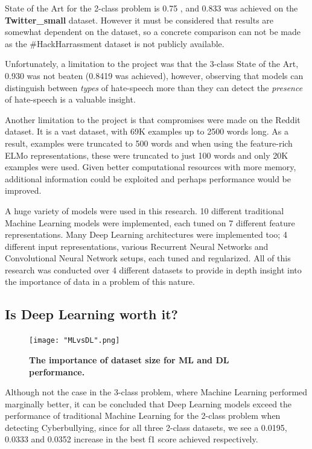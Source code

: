 \documentclass[12pt,a4paper]{article}
\begin{document}
State of the Art for the 2-class problem is 0.75 \cite{Hack}, and 0.833 was achieved on the \textbf{Twitter\_small} dataset. However it must be considered that results are somewhat dependent on the dataset, so a concrete comparison can not be made as the \#HackHarrassment dataset is not publicly available. 

Unfortunately, a limitation to the project was that the 3-class State of the Art, 0.930 \cite{Badjatiya} was not beaten (0.8419 was achieved), however, observing that models can distinguish between \textit{types} of hate-speech more than they can detect the \textit{presence} of hate-speech is a valuable insight.

Another limitation to the project is that compromises were made on the Reddit dataset. It is a vast dataset, with 69K examples up to 2500 words long. As a result, examples were truncated to 500 words and when using the feature-rich ELMo representations, these were truncated to just 100 words and only 20K examples were used. Given better computational resources with more memory, additional information could be exploited and perhaps performance would be improved. 

A huge variety of models were used in this research. 10 different traditional Machine Learning models were implemented, each tuned on 7 different feature representations. Many Deep Learning architectures were implemented too; 4 different input representations, various Recurrent Neural Networks and Convolutional Neural Network setups, each tuned and regularized. All of this research was conducted over 4 different datasets to provide in depth insight into the importance of data in a problem of this nature. 


\subsection{Is Deep Learning worth it?}
\begin{figure}
	\centering
	\texttt{[image: "MLvsDL".png]} 
	\caption{\textbf{The importance of dataset size for ML and DL performance.}}
	\label{MLvsDL}
\end{figure}

Although not the case in the 3-class problem, where Machine Learning performed marginally better, it can be concluded that Deep Learning models exceed the performance of traditional Machine Learning for the 2-class problem when detecting Cyberbullying, since for all three 2-class datasets, we see a 0.0195, 0.0333 and 0.0352 increase in the best f1 score achieved respectively. 
\end{document}
